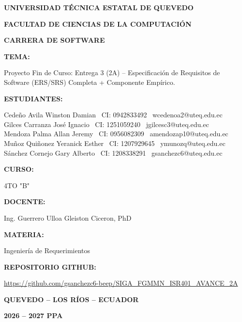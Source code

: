 \documentclass[11pt,letterpaper]{article}
\title{}
\date{}
\begin{document}
\begin{titlepage}
\centering
{\bfseries\Large UNIVERSIDAD T\'ECNICA ESTATAL DE QUEVEDO\par}
\vspace{2mm}
{\bfseries\large FACULTAD DE CIENCIAS DE LA COMPUTACI\'ON\par}
\vspace{2mm}
{\bfseries\large CARRERA DE SOFTWARE\par}
\vspace{10mm}
{\bfseries TEMA:\par}
\vspace{2mm}
Proyecto Fin de Curso: Entrega 3 (2A) -- Especificaci\'on de Requisitos de\\
Software (ERS/SRS) Completa + Componente Emp\'irico.
\vspace{8mm}

{\bfseries ESTUDIANTES:\par}
\vspace{2mm}
Cede\~no Avila Winston Damian \textbar\ CI: 0942833492 \textbar\ wcedenoa2@uteq.edu.ec\\
Gilces Carranza Jos\'e Ignacio \textbar\ CI: 1251059240 \textbar\ jgilcesc3@uteq.edu.ec\\
Mendoza Palma Allan Jeremy \textbar\ CI: 0956082309 \textbar\ amendozap10@uteq.edu.ec\\
Mu\~noz Qui\~nonez Yeranick Esther \textbar\ CI: 1207929645 \textbar\ ymunozq@uteq.edu.ec\\
S\'anchez Cornejo Gary Alberto \textbar\ CI: 1208338291 \textbar\ gsanchezc6@uteq.edu.ec
\vspace{8mm}

{\bfseries CURSO:\par}
4TO "B"
\vspace{6mm}

{\bfseries DOCENTE:\par}
Ing. Guerrero Ulloa Gleiston Ciceron, PhD
\vspace{6mm}

{\bfseries MATERIA:\par}
Ingenier\'ia de Requerimientos
\vspace{6mm}

{\bfseries REPOSITORIO GITHUB:\par}
\url{https://github.com/gsanchezc6-beep/SIGA_FGMMN_ISR401_AVANCE_2A}
\vspace{10mm}

{\bfseries QUEVEDO -- LOS R\'IOS -- ECUADOR\par}
{\bfseries 2026 -- 2027 PPA\par}
\end{titlepage}

\newpage
\tableofcontents
\newpage
\listoftables
\newpage
\listoffigures
\newpage


\end{document}
